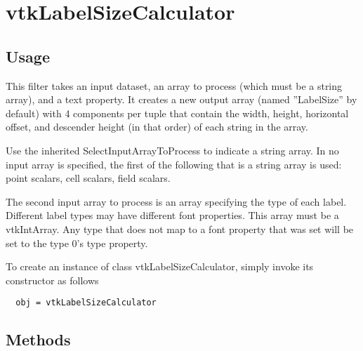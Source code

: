\section{vtkLabelSizeCalculator}

\subsection{Usage}

 This filter takes an input dataset, an array to process
 (which must be a string array), and a text property.
 It creates a new output array (named ''LabelSize'' by default) with
 4 components per tuple that contain the width, height, horizontal
 offset, and descender height (in that order) of each string in
 the array.

 Use the inherited SelectInputArrayToProcess to indicate a string array.
 In no input array is specified, the first of the following that
 is a string array is used: point scalars, cell scalars, field scalars.

 The second input array to process is an array specifying the type of
 each label. Different label types may have different font properties.
 This array must be a vtkIntArray.
 Any type that does not map to a font property that was set will
 be set to the type 0's type property.

To create an instance of class vtkLabelSizeCalculator, simply
invoke its constructor as follows
\begin{verbatim}
  obj = vtkLabelSizeCalculator
\end{verbatim}
\subsection{Methods}

